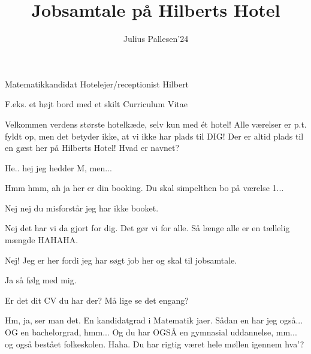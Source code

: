 \documentclass[a4paper,11pt]{article}
\title{Jobsamtale på Hilberts Hotel}
\author{Julius Pallesen'24}
\begin{document}
\maketitle

\begin{roles}
 Matematikkandidat
 Hotelejer/receptionist Hilbert
\end{roles}

\begin{props}
     F.eks. et højt bord med et skilt
     Curriculum Vitae
\end{props}


\begin{sketch}

 Velkommen verdens største hotelkæde, selv kun med ét hotel! Alle værelser er p.t. fyldt op, men det betyder ikke, at vi ikke har plads til DIG! Der er altid plads til en gæst her på Hilberts Hotel! Hvad er navnet?

 He.. hej jeg hedder M, men... 

  Hmm hmm, ah ja her er din booking. Du skal simpelthen bo på værelse 1...

  Nej nej du misforstår jeg har ikke booket.

 Nej det har vi da gjort for dig. Det gør vi for alle. Så længe alle er en tællelig mængde HAHAHA.

 Nej! Jeg er her fordi jeg har søgt job her og skal til jobsamtale.


 Ja så følg med mig.


 Er det dit CV du har der? Må lige se det engang?

 

  Hm, ja, ser man det. En kandidatgrad i Matematik jaer. Sådan en har jeg også... OG en bachelorgrad, hmm... Og du har OGSÅ en gymnasial uddannelse, mm... og også bestået folkeskolen. Haha. Du har rigtig været hele møllen igennem hva'?


\end{sketch}
\end{document}
